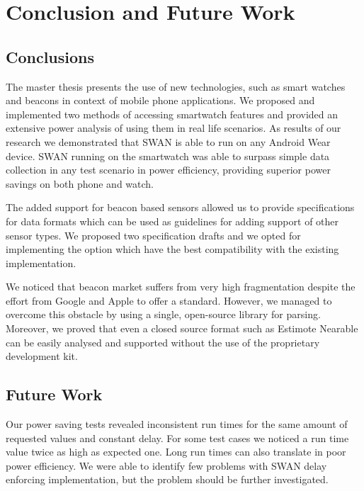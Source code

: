 
\chapter{Conclusion and Future Work} %

\label{Chapter7} %



\section{Conclusions}
The master thesis presents the use of new technologies, such as smart watches and beacons in context of mobile phone applications. We proposed and implemented two methods 
of accessing smartwatch features and provided an extensive power analysis of using them in real life scenarios. As results of our research we demonstrated that SWAN is able to run
on any Android Wear device. SWAN running on the smartwatch was able to surpass simple data collection in any test scenario in power efficiency,
providing superior power savings on both phone and watch.

The added support for beacon based sensors allowed us to provide specifications for data formats which can be used as guidelines for adding support of other sensor types. We proposed two
specification drafts and we opted for implementing the option which have the best compatibility with the existing implementation.

We noticed that beacon market suffers from very high fragmentation despite the effort from Google and Apple to offer a standard. However, we managed to overcome this obstacle by using
a single, open-source library for parsing. Moreover, we proved that even a closed source format such as Estimote Nearable can be easily analysed and supported without the use of the proprietary development kit.

\section{Future Work}
Our power saving tests revealed inconsistent run times for the same amount of requested values and constant delay. For some test cases we noticed a run time value twice as high as expected one.
Long run times can also translate in poor power efficiency. We were able to identify few problems with SWAN delay enforcing implementation, but the problem should be further investigated.


